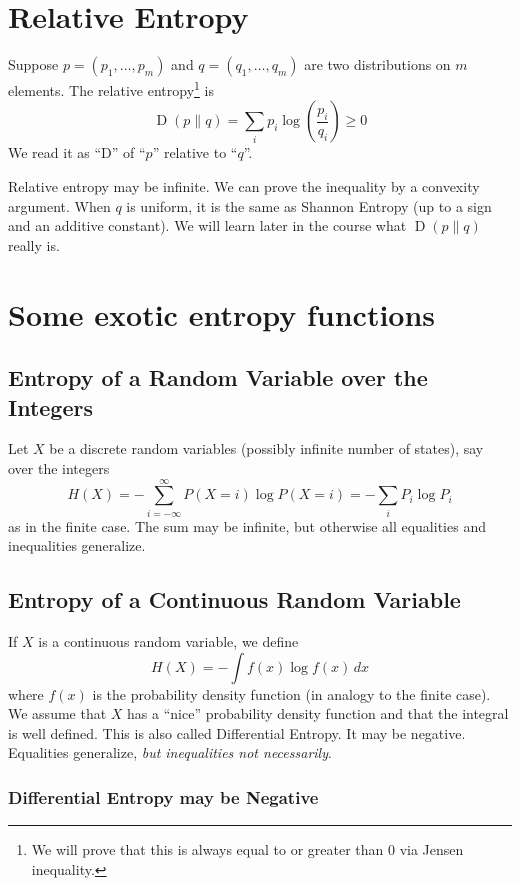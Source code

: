 \documentclass{article}
\begin{document}
\section{Relative Entropy}

Suppose $p=\left(p_1,\ldots, p_m\right)$ and $q=\left(q_1,\ldots, q_m\right)$ are two distributions on $m$ elements. The relative entropy\footnote{We will prove that this is always equal to or greater than 0 via Jensen inequality.} is 
\[
\operatorname{D}\left(p\| q\right)=\sum_i p_i\log \left(\frac{p_i}{q_i}\right)\geq 0
\]
We read it as ``D'' of ``$p$'' relative to ``$q$''.

Relative entropy may be infinite. We can prove the inequality by a convexity argument. When $q$ is uniform, it is the same as Shannon Entropy (up to a sign and an additive constant). We will learn later in the course what $\operatorname{D}\left(p\| q\right)$ really is.

\section{Some exotic entropy functions}

\subsection{Entropy of a Random Variable over the Integers}

Let $X$ be a discrete random variables (possibly infinite number of states), say over the integers 
\[
H(X)=-\sum_{i=-\infty}^{\infty}P(X=i)\log P(X=i)=-\sum_i P_i \log P_i
\]
as in the finite case. The sum may be infinite, but otherwise all equalities and inequalities generalize.

\subsection{Entropy of a Continuous Random Variable}

If $X$ is a continuous random variable, we define 
\[
H(X) = -\int f(x)\log f(x) \, dx
\]
where $f(x)$ is the probability density function (in analogy to the finite case). We assume that $X$ has a ``nice'' probability density function and that the integral is well defined. This is also called Differential Entropy. It may be negative. Equalities generalize, \textit{but inequalities not necessarily}.

\subsubsection{Differential Entropy may be Negative}
\end{document}
